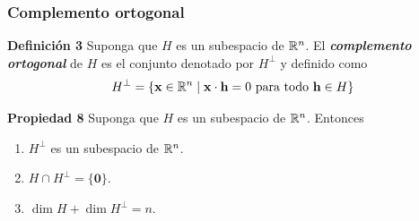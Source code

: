\begin{frame}\frametitle{Complemento ortogonal}
	
	\begin{defi}{\textbf{Definición 3}}
		\justifying
		Suponga que $H$ es un subespacio de $\mathbb{R}^n$. El \textbf{\textit{complemento ortogonal}} de $H$ es el conjunto denotado
		por $H^{\perp}$ y definido como
		\[
		H^{\perp} = \{ \mathbf{x}\in\mathbb{R}^n \mid  \mathbf{x}\cdot \mathbf{h}=0 \text{ para todo } \mathbf{h}\in H \}
		\]
		
		\vspace{-1mm}
	\end{defi}	
	
	\begin{prop}{\textbf{Propiedad 8}}
		\justifying Suponga que $H$ es un subespacio de $\mathbb{R}^n$. Entonces
		
		\vspace{-2mm}
		\begin{multicols}{2}
			\begin{enumerate}\justifying
				\item[\labelname{$a$}] $H^{\perp}$ es un subespacio de $\mathbb{R}^n$.
				\item[\labelname{$b$}] $H\cap H^{\perp} = \{ \mathbf{0}\}$.
				\item[\labelname{$c$}] $\dim H + \dim H^{\perp} = n$.
			\end{enumerate}
		\end{multicols}
		
		\vspace{-3mm}
	\end{prop}	


		
\end{frame}


\subsection{}

